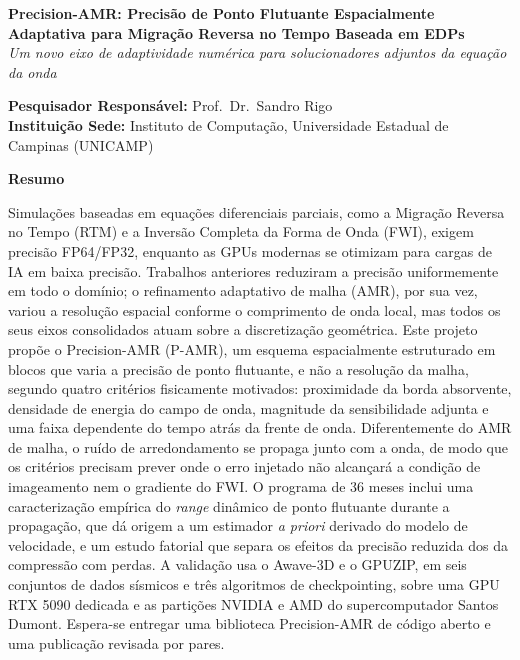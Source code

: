 \documentclass[12pt,a4paper]{article}
\newcommand{\pamr}{P\nobreakdash-AMR}
\begin{document}
\thispagestyle{empty}
\begin{otherlanguage}{brazilian}

\begin{center}
{\large\bfseries Precision-AMR: Precisão de Ponto Flutuante Espacialmente
Adaptativa para Migração Reversa no Tempo Baseada em EDPs}\\[0.6em]
{\itshape Um novo eixo de adaptividade numérica para solucionadores
adjuntos da equação da onda}
\end{center}

\vspace{1.5em}

\begin{flushleft}
\textbf{Pesquisador Responsável:} Prof.\ Dr.\ Sandro Rigo\\
\textbf{Instituição Sede:} Instituto de Computação, Universidade Estadual de
Campinas (UNICAMP)
\end{flushleft}

\vspace{1.5em}

\noindent\textbf{Resumo}

\vspace{0.5em}

Simulações baseadas em equações diferenciais parciais, como a Migração
Reversa no Tempo (RTM) e a Inversão Completa da Forma de Onda (FWI), exigem
precisão FP64/FP32, enquanto as GPUs modernas se otimizam para cargas de IA
em baixa precisão. Trabalhos anteriores reduziram a precisão uniformemente
em todo o domínio; o refinamento adaptativo de malha (AMR), por sua vez,
variou a resolução espacial conforme o comprimento de onda local, mas todos
os seus eixos consolidados atuam sobre a discretização geométrica. Este
projeto propõe o Precision-AMR (\pamr{}), um esquema espacialmente
estruturado em blocos que varia a precisão de ponto flutuante, e não a
resolução da malha, segundo quatro critérios fisicamente motivados:
proximidade da borda absorvente, densidade de energia do campo de onda,
magnitude da sensibilidade adjunta e uma faixa dependente do tempo atrás da
frente de onda. Diferentemente do AMR de malha, o ruído de arredondamento se
propaga junto com a onda, de modo que os critérios precisam prever onde o
erro injetado não alcançará a condição de imageamento nem o gradiente do
FWI. O programa de 36 meses inclui uma caracterização empírica do
\emph{range} dinâmico de ponto flutuante durante a propagação, que dá origem
a um estimador \emph{a priori} derivado do modelo de velocidade, e um estudo
fatorial que separa os efeitos da precisão reduzida dos da compressão com
perdas. A validação usa o Awave-3D e o GPUZIP, em seis conjuntos de dados
sísmicos e três algoritmos de checkpointing, sobre uma GPU RTX 5090 dedicada
e as partições NVIDIA e AMD do supercomputador Santos Dumont. Espera-se
entregar uma biblioteca Precision-AMR de código aberto e uma publicação
revisada por pares.


\end{otherlanguage}
\end{document}

